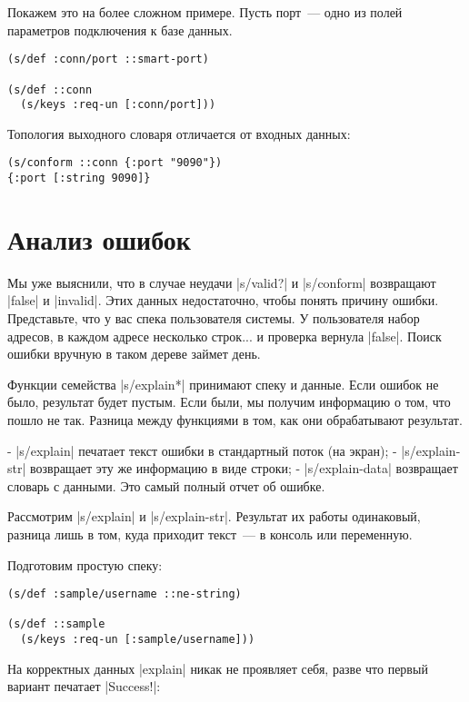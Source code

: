 Покажем это на более сложном примере. Пусть порт~--- одно из полей параметров
подключения к базе данных.

\begin{verbatim}
(s/def :conn/port ::smart-port)

(s/def ::conn
  (s/keys :req-un [:conn/port]))
\end{verbatim}

Топология выходного словаря отличается от входных данных:

\begin{verbatim}
(s/conform ::conn {:port "9090"})
{:port [:string 9090]}
\end{verbatim}

\section{Анализ ошибок}

Мы уже выяснили, что в случае неудачи \spverb|s/valid?| и \spverb|s/conform| возвращают
\spverb|false| и \spverb|invalid|. Этих данных недостаточно, чтобы понять причину
ошибки. Представьте, что у вас спека пользователя системы. У пользователя набор
адресов, в каждом адресе несколько строк... и проверка вернула \spverb|false|. Поиск
ошибки вручную в таком дереве займет день.

Функции семейства \spverb|s/explain*| принимают спеку и данные. Если ошибок не было,
результат будет пустым. Если были, мы получим информацию о том, что пошло не
так. Разница между функциями в том, как они обрабатывают результат.

- \spverb|s/explain| печатает текст ошибки в стандартный поток (на экран);
- \spverb|s/explain-str| возвращает эту же информацию в виде строки;
- \spverb|s/explain-data| возвращает словарь с данными. Это самый полный отчет об
  ошибке.

Рассмотрим \spverb|s/explain| и \spverb|s/explain-str|. Результат их работы одинаковый,
разница лишь в том, куда приходит текст~--- в консоль или переменную.

Подготовим простую спеку:

\begin{verbatim}
(s/def :sample/username ::ne-string)

(s/def ::sample
  (s/keys :req-un [:sample/username]))
\end{verbatim}

На корректных данных \spverb|explain| никак не проявляет себя, разве что первый вариант
печатает \spverb|Success!|:

